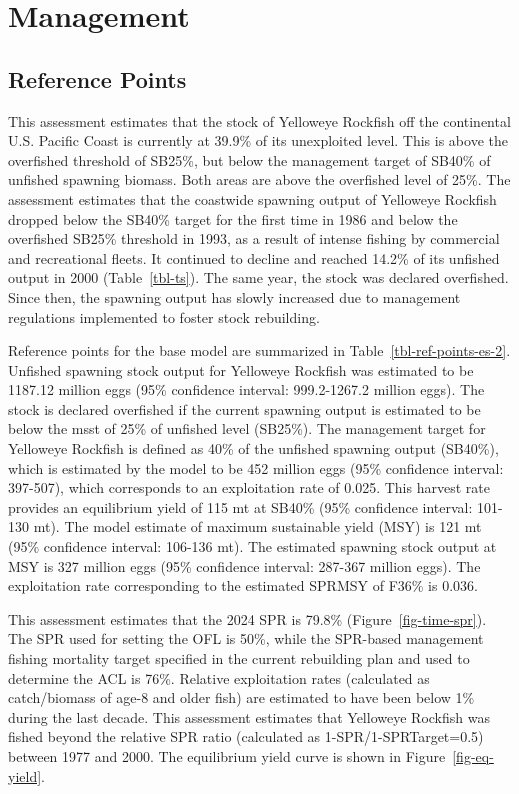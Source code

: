 \documentclass[
]{scrartcl}
\begin{document}
\section{Management}\label{management}

\subsection{Reference Points}\label{reference-points-1}

This assessment estimates that the stock of Yelloweye Rockfish off the
continental U.S. Pacific Coast is currently at 39.9\% of its unexploited
level. This is above the overfished threshold of SB25\%, but below the
management target of SB40\% of unfished spawning biomass. Both areas are
above the overfished level of 25\%. The assessment estimates that the
coastwide spawning output of Yelloweye Rockfish dropped below the SB40\%
target for the first time in 1986 and below the overfished SB25\%
threshold in 1993, as a result of intense fishing by commercial and
recreational fleets. It continued to decline and reached 14.2\% of its
unfished output in 2000 (Table~\ref{tbl-ts}). The same year, the stock
was declared overfished. Since then, the spawning output has slowly
increased due to management regulations implemented to foster stock
rebuilding.

Reference points for the base model are summarized in
Table~\ref{tbl-ref-points-es-2}. Unfished spawning stock output for
Yelloweye Rockfish was estimated to be 1187.12 million eggs (95\%
confidence interval: 999.2-1267.2 million eggs). The stock is declared
overfished if the current spawning output is estimated to be below the
\gls{msst} of 25\% of unfished level (SB25\%). The management target for
Yelloweye Rockfish is defined as 40\% of the unfished spawning output
(SB40\%), which is estimated by the model to be 452 million eggs (95\%
confidence interval: 397-507), which corresponds to an exploitation rate
of 0.025. This harvest rate provides an equilibrium yield of 115 mt at
SB40\% (95\% confidence interval: 101-130 mt). The model estimate of
maximum sustainable yield (MSY) is 121 mt (95\% confidence interval:
106-136 mt). The estimated spawning stock output at MSY is 327 million
eggs (95\% confidence interval: 287-367 million eggs). The exploitation
rate corresponding to the estimated SPRMSY of F36\% is 0.036.

This assessment estimates that the 2024 SPR is 79.8\%
(Figure~\ref{fig-time-spr}). The SPR used for setting the OFL is 50\%,
while the SPR-based management fishing mortality target specified in the
current rebuilding plan and used to determine the ACL is 76\%. Relative
exploitation rates (calculated as catch/biomass of age-8 and older fish)
are estimated to have been below 1\% during the last decade. This
assessment estimates that Yelloweye Rockfish was fished beyond the
relative SPR ratio (calculated as 1-SPR/1-SPRTarget=0.5) between 1977
and 2000. The equilibrium yield curve is shown in
Figure~\ref{fig-eq-yield}.
\end{document}
